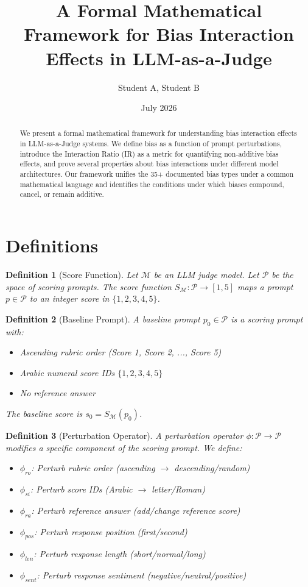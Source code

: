 \documentclass[11pt]{article}
\title{A Formal Mathematical Framework for Bias Interaction Effects in LLM-as-a-Judge}
\author{Student A, Student B}
\date{July 2026}
\newtheorem{definition}{Definition}
\begin{document}
\maketitle

\begin{abstract}
We present a formal mathematical framework for understanding bias interaction effects in LLM-as-a-Judge systems. We define bias as a function of prompt perturbations, introduce the Interaction Ratio (IR) as a metric for quantifying non-additive bias effects, and prove several properties about bias interactions under different model architectures. Our framework unifies the 35+ documented bias types under a common mathematical language and identifies the conditions under which biases compound, cancel, or remain additive.
\end{abstract}

\section{Definitions}

\begin{definition}[Score Function]
Let $\mathcal{M}$ be an LLM judge model. Let $\mathcal{P}$ be the space of scoring prompts. The score function $S_\mathcal{M}: \mathcal{P} \rightarrow [1,5]$ maps a prompt $p \in \mathcal{P}$ to an integer score in $\{1,2,3,4,5\}$.
\end{definition}

\begin{definition}[Baseline Prompt]
A baseline prompt $p_0 \in \mathcal{P}$ is a scoring prompt with:
\begin{itemize}
    \item Ascending rubric order (Score 1, Score 2, ..., Score 5)
    \item Arabic numeral score IDs $\{1,2,3,4,5\}$
    \item No reference answer
\end{itemize}
The baseline score is $s_0 = S_\mathcal{M}(p_0)$.
\end{definition}

\begin{definition}[Perturbation Operator]
A perturbation operator $\phi: \mathcal{P} \rightarrow \mathcal{P}$ modifies a specific component of the scoring prompt. We define:
\begin{itemize}
    \item $\phi_{ro}$: Perturb rubric order (ascending $\to$ descending/random)
    \item $\phi_{si}$: Perturb score IDs (Arabic $\to$ letter/Roman)
    \item $\phi_{ra}$: Perturb reference answer (add/change reference score)
    \item $\phi_{pos}$: Perturb response position (first/second)
    \item $\phi_{len}$: Perturb response length (short/normal/long)
    \item $\phi_{sent}$: Perturb response sentiment (negative/neutral/positive)
\end{itemize}
\end{definition}
\end{document}
